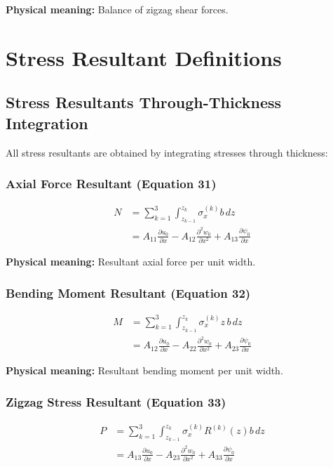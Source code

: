 \documentclass[12pt,a4paper]{article}
\begin{document}
\textbf{Physical meaning:} Balance of zigzag shear forces.

\section{Stress Resultant Definitions}

\subsection{Stress Resultants Through-Thickness Integration}

All stress resultants are obtained by integrating stresses through thickness:

\subsubsection{Axial Force Resultant (Equation 31)}

\begin{align}
N &= \sum_{k=1}^{3} \int_{z_{k-1}}^{z_k} \sigma_x^{(k)} b \, dz \nonumber \\
  &= A_{11} \frac{\partial u_0}{\partial x}
   - A_{12} \frac{\partial^2 w_0}{\partial x^2}
   + A_{13} \frac{\partial \psi_0}{\partial x}
\end{align}

\textbf{Physical meaning:} Resultant axial force per unit width.

\subsubsection{Bending Moment Resultant (Equation 32)}

\begin{align}
M &= \sum_{k=1}^{3} \int_{z_{k-1}}^{z_k} \sigma_x^{(k)} z \, b \, dz \nonumber \\
  &= A_{12} \frac{\partial u_0}{\partial x}
   - A_{22} \frac{\partial^2 w_0}{\partial x^2}
   + A_{23} \frac{\partial \psi_0}{\partial x}
\end{align}

\textbf{Physical meaning:} Resultant bending moment per unit width.

\subsubsection{Zigzag Stress Resultant (Equation 33)}

\begin{align}
P &= \sum_{k=1}^{3} \int_{z_{k-1}}^{z_k} \sigma_x^{(k)} R^{(k)}(z) b \, dz \nonumber \\
  &= A_{13} \frac{\partial u_0}{\partial x}
   - A_{23} \frac{\partial^2 w_0}{\partial x^2}
   + A_{33} \frac{\partial \psi_0}{\partial x}
\end{align}
\end{document}

